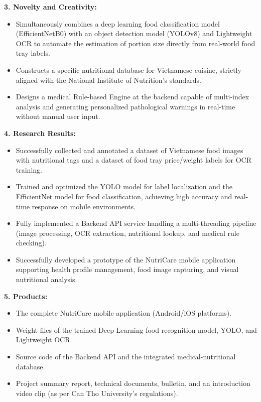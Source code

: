 \vspace{0.3cm}
\noindent\textbf{3. Novelty and Creativity:}
\begin{itemize}[leftmargin=0.8cm, label=\textbullet, itemsep=2pt, topsep=2pt]
    \item Simultaneously combines a deep learning food classification model (EfficientNetB0) with an object detection model (YOLOv8) and Lightweight OCR to automate the estimation of portion size directly from real-world food tray labels.
    \item Constructs a specific nutritional database for Vietnamese cuisine, strictly aligned with the National Institute of Nutrition's standards.
    \item Designs a medical Rule-based Engine at the backend capable of multi-index analysis and generating personalized pathological warnings in real-time without manual user input.
\end{itemize}

\vspace{0.3cm}
\noindent\textbf{4. Research Results:}
\begin{itemize}[leftmargin=0.8cm, label=\textbullet, itemsep=2pt, topsep=2pt]
    \item Successfully collected and annotated a dataset of Vietnamese food images with nutritional tags and a dataset of food tray price/weight labels for OCR training.
    \item Trained and optimized the YOLO model for label localization and the EfficientNet model for food classification, achieving high accuracy and real-time response on mobile environments.
    \item Fully implemented a Backend API service handling a multi-threading pipeline (image processing, OCR extraction, nutritional lookup, and medical rule checking).
    \item Successfully developed a prototype of the NutriCare mobile application supporting health profile management, food image capturing, and visual nutritional analysis.
\end{itemize}

\vspace{0.3cm}
\noindent\textbf{5. Products:}
\begin{itemize}[leftmargin=0.8cm, label=\textbullet, itemsep=2pt, topsep=2pt]
    \item The complete NutriCare mobile application (Android/iOS platforms).
    \item Weight files of the trained Deep Learning food recognition model, YOLO, and Lightweight OCR.
    \item Source code of the Backend API and the integrated medical-nutritional database.
    \item Project summary report, technical documents, bulletin, and an introduction video clip (as per Can Tho University's regulations).
\end{itemize}

